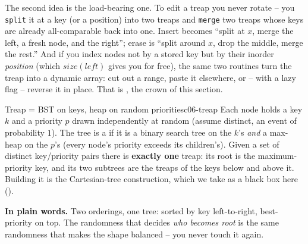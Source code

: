 The second idea is the load-bearing one. To edit a treap you never rotate -- you \texttt{split} it at a
key (or a position) into two treaps and \texttt{merge} two treaps whose keys are already all-comparable
back into one. Insert becomes ``split at $x$, merge the left, a fresh node, and the right''; erase is
``split around $x$, drop the middle, merge the rest.'' And if you index nodes not by a stored key but by
their inorder \emph{position} (which $\mathit{size}(\mathit{left})$ gives you for free), the same two
routines turn the treap into a dynamic array: cut out a range, paste it elsewhere, or -- with a lazy flag
-- reverse it in place. That is , the crown of this section.

\begin{definition}{Treap = BST on keys, heap on random priorities}{c06-treap}
Each node holds a key $k$ and a priority $p$ drawn independently at random (assume distinct, an event of
probability $1$). The tree is a  if it is a binary search tree on the $k$'s \emph{and} a
max-heap on the $p$'s (every node's priority exceeds its children's). Given a set of distinct
key/priority pairs there is \textbf{exactly one} treap: its root is the maximum-priority key, and its two
subtrees are the treaps of the keys below and above it. Building it is the Cartesian-tree construction,
which we take as a black box here ().
\end{definition}

\noindent\textbf{In plain words.} Two orderings, one tree: sorted by key left-to-right, best-priority on
top. The randomness that decides \emph{who becomes root} is the same randomness that makes the shape
balanced -- you never touch it again.

